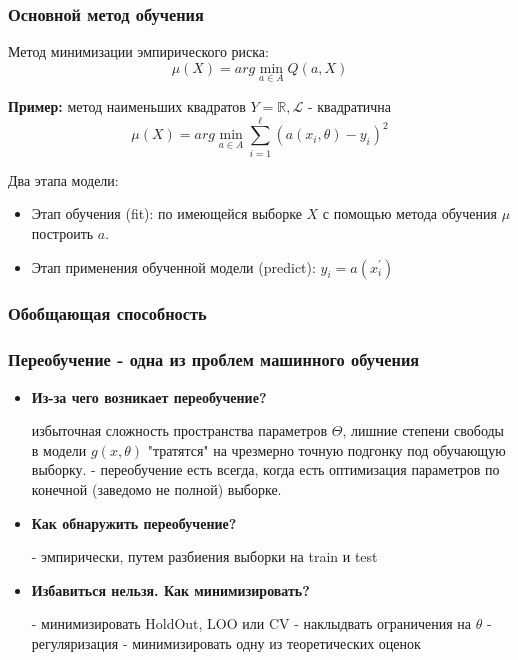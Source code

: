 \documentclass{beamer}
\begin{document}
		
	\begin{frame}
		\frametitle{Основной метод обучения}
		Метод минимизации эмпирического риска:
		$$
		\mu(X) = arg \min_{a \in A} Q(a, X)
		$$
		
		\textbf{Пример:} метод наименьших квадратов $Y = \mathbb{R}, \mathcal{L}$ - квадратична
		$$
		\mu(X) = arg \min_{a \in A} \sum_{i=1}^{\ell} (a(x_i, \theta) - y_i)^{2}
		$$
		
		\vspace{5}
		
		Два этапа модели:
		\begin{itemize}
			\item Этап обучения (fit): по имеющейся выборке $X$ с помощью метода обучения $\mu$ построить $a$.
		
			\item Этап применения обученной модели (predict): $\hat{y}_i = a(x_i^{'})$
		\end{itemize}
	\end{frame}
		
	\begin{frame}
		\frametitle{Обобщающая способность}
		
	\end{frame}


	\begin{frame}
		\frametitle{Переобучение - одна из проблем машинного обучения}
		\begin{itemize}
			\item \textbf{Из-за чего возникает переобучение?}
			
			избыточная сложность пространства параметров $\Theta$, лишние степени свободы в модели $g(x, \theta)$ "тратятся" на чрезмерно точную подгонку под обучающую выборку. - переобучение есть всегда, когда есть оптимизация параметров по конечной (заведомо не полной) выборке.
			
			\item \textbf{Как обнаружить переобучение?}
			
			- эмпирически, путем разбиения выборки на train и test
			
			\item \textbf{Избавиться нельзя. Как минимизировать?}
			
			- минимизировать HoldOut, LOO или CV
			- наклыдвать ограничения на $\theta$ - регуляризация
			- минимизировать одну из теоретических оценок
		\end{itemize}
	\end{frame}
\end{document}
